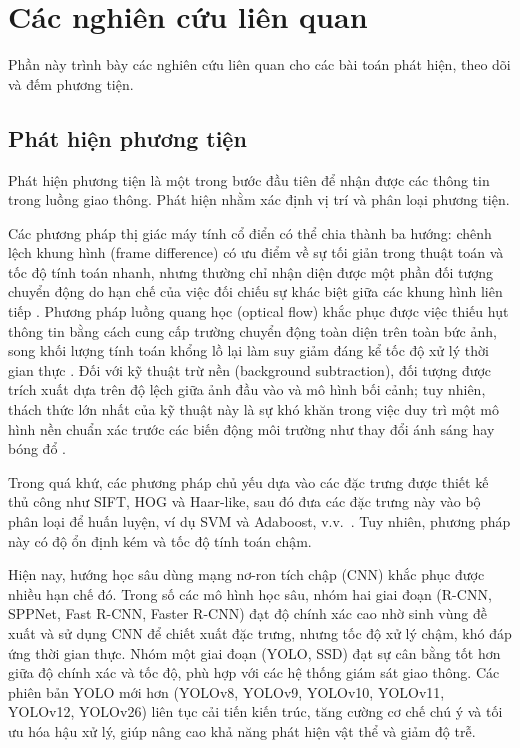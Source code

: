 \section{Các nghiên cứu liên quan}

Phần này trình bày các nghiên cứu liên quan cho các bài toán phát hiện, theo
dõi và đếm phương tiện.

\subsection{Phát hiện phương tiện}

Phát hiện phương tiện là một trong bước đầu tiên để nhận được các thông tin
trong luồng giao thông. Phát hiện nhằm xác định vị trí và phân loại phương
tiện.

Các phương pháp thị giác máy tính cổ điển có thể chia thành ba hướng: chênh
lệch khung hình (frame difference) có ưu điểm về sự tối giản trong thuật toán
và tốc độ tính toán nhanh, nhưng thường chỉ nhận diện được một phần đối tượng
chuyển động do hạn chế của việc đối chiếu sự khác biệt giữa các khung hình liên
tiếp \cite{song2019}. Phương pháp luồng quang học (optical flow) khắc phục được
việc thiếu hụt thông tin bằng cách cung cấp trường chuyển động toàn diện trên
toàn bức ảnh, song khối lượng tính toán khổng lồ lại làm suy giảm đáng kể tốc
độ xử lý thời gian thực \cite{dai2019}. Đối với kỹ thuật trừ nền (background
subtraction), đối tượng được trích xuất dựa trên độ lệch giữa ảnh đầu vào và mô
hình bối cảnh; tuy nhiên, thách thức lớn nhất của kỹ thuật này là sự khó khăn
trong việc duy trì một mô hình nền chuẩn xác trước các biến động môi trường như
thay đổi ánh sáng hay bóng đổ \cite{dai2019}.

Trong quá khứ, các phương pháp chủ yếu dựa vào các đặc trưng được thiết kế thủ
công như SIFT, HOG và Haar-like, sau đó đưa các đặc trưng này vào bộ phân loại
để huấn luyện, ví dụ SVM và Adaboost, v.v.~\cite{dai2019}. Tuy nhiên, phương
pháp này có độ ổn định kém và tốc độ tính toán chậm.

Hiện nay, hướng học sâu dùng mạng nơ-ron tích chập (CNN) khắc phục được nhiều
hạn chế đó. Trong số các mô hình học sâu, nhóm hai giai đoạn (R-CNN, SPPNet,
Fast R-CNN, Faster R-CNN) đạt độ chính xác cao nhờ sinh vùng đề xuất và sử dụng
CNN để chiết xuất đặc trưng, nhưng tốc độ xử lý chậm, khó đáp ứng thời gian
thực. Nhóm một giai đoạn (YOLO, SSD) đạt sự cân bằng tốt hơn giữa độ chính xác
và tốc độ, phù hợp với các hệ thống giám sát giao thông. Các phiên bản YOLO mới
hơn (YOLOv8, YOLOv9, YOLOv10, YOLOv11, YOLOv12, YOLOv26) liên tục cải tiến kiến
trúc, tăng cường cơ chế chú ý và tối ưu hóa hậu xử lý, giúp nâng cao khả năng
phát hiện vật thể và giảm độ trễ.

